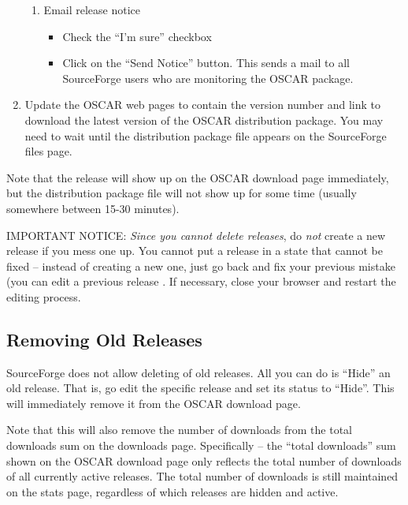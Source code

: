 \begin{enumerate}
\begin{enumerate}
  \item Email release notice

    \begin{itemize}
    \item Check the ``I'm sure'' checkbox

    \item Click on the ``Send Notice'' button.  This sends a mail to
    all SourceForge users who are monitoring the OSCAR package.
    \end{itemize}
    
  \end{enumerate}
  
\item Update the OSCAR web pages to contain the version number and
  link to download the latest version of the OSCAR distribution
  package.  You may need to wait until the distribution package file
  appears on the SourceForge files page.
  
\end{enumerate}

Note that the release will show up on the OSCAR download page
immediately, but the distribution package file will not show up for
some time (usually somewhere between 15-30 minutes).

{\large IMPORTANT NOTICE}: {\em Since you cannot delete releases}, do
{\em not} create a new release if you mess one up.  You cannot put a
release in a state that cannot be fixed -- instead of creating a new
one, just go back and fix your previous mistake (you can edit a
previous release .  If necessary, close
your browser and restart the editing process.


\subsection{Removing Old Releases}

SourceForge does not allow deleting of old releases.  All you can do
is ``Hide'' an old release.  That is, go edit the specific release and
set its status to ``Hide''.  This will immediately remove it from the
OSCAR download page.

Note that this will also remove the number of downloads from the total
downloads sum on the downloads page.  Specifically -- the ``total
downloads'' sum shown on the OSCAR download page only reflects the
total number of downloads of all currently active releases.  The total
number of downloads is still maintained on the stats page, regardless
of which releases are hidden and active.

